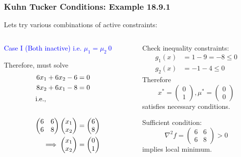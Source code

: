 \documentclass{beamer}
\begin{document}
\begin{frame}\frametitle{Kuhn Tucker Conditions: Example 18.9.1}
	Lets try various combinations of active constraints:
	
	\begin{columns}
		\begin{column}{0.5\textwidth}
			\textcolor{blue}{Case I  (Both inactive) 
			i.e. $\mu_1 = \mu_2 \ 0$}
			
			Therefore, must solve
			\begin{align*}
			  6x_1 + 6x_2 - 6 &= 0\\
			  8x_2 + 6x_1 - 8 &= 0\\
			\intertext{i.e.,}\\
			\begin{pmatrix}
			    6 & 6\\
			    6 & 8
			  \end{pmatrix}\begin{pmatrix}
			    x_1\\x_2
			  \end{pmatrix}&=\begin{pmatrix}
			    6\\8
			  \end{pmatrix}\\
			\implies 
			\begin{pmatrix}
			    x_1\\x_2
			  \end{pmatrix}&=\begin{pmatrix}
			    0\\1
			  \end{pmatrix}
			\end{align*}	
		\end{column}
		\begin{column}{0.5\textwidth}
			Check inequality constraints:
			\begin{align*}
				g_1(x) &= 1 - 9 = -8 \leq 0 \\
				g_2(x) &= -1 - 4 \leq 0
			\end{align*}
			Therefore
			\[
				x^{\ast} = \begin{pmatrix}
			    			0\\1
			  			   \end{pmatrix}, 
			  	\mu^{\ast} = \begin{pmatrix}
			    				0\\0
			  			     \end{pmatrix}
			\]
			satisfies necessary conditions.
			
			Sufficient condition:
			\[ 
				\nabla^2 f 
					= \begin{pmatrix}
			    		6 & 6\\
			    		6 & 8
			  		  \end{pmatrix} > 0  
			\]	
			implies local minimum.		
		\end{column}
	\end{columns}
\end{frame}
\end{document}
